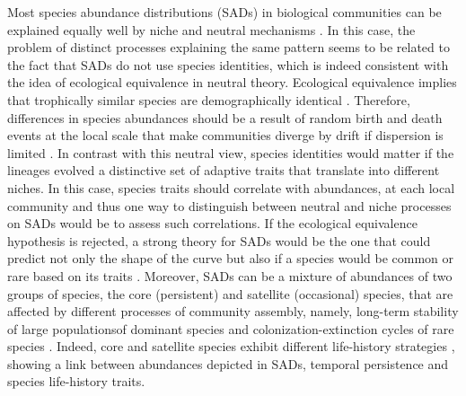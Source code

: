 \documentclass[12pt]{article}
\begin{document}
Most species abundance distributions (SADs) in biological communities can be explained equally well by niche and neutral mechanisms \citep{McGill2007}. 
In this case, the problem of distinct processes explaining the same pattern seems to be related to the fact that SADs do not use species identities, which is indeed consistent with the idea of ecological equivalence in neutral theory. Ecological equivalence implies that trophically similar species are demographically identical \citep{Hubbell2001, Hubbell2005}. Therefore, differences in species abundances should be a result of random birth and death events at the local scale that make communities diverge by drift if dispersion is limited \citep{Hubbell2001, Hubbell2005}. 
In contrast with this neutral view, species identities would matter if the lineages evolved a distinctive set of adaptive traits that translate into different niches. In this case, species traits should correlate with abundances,
at each local community %
and thus one way to distinguish between neutral and niche processes on SADs would be to assess such correlations. 
If the ecological equivalence hypothesis is rejected, a strong theory for SADs would be the one that could predict not only the shape of the curve but also if a species would be common or rare based on its traits \citep{Mcgill2003}. 
Moreover, SADs can be a mixture of abundances of two groups of species, the core (persistent) and satellite (occasional) species, that are affected by different processes of community assembly, namely, long-term stability of large populationsof dominant species and  colonization-extinction cycles of rare species \citep{Magurran2003}. Indeed, core and satellite species exhibit different life-history strategies \cite{Supp2015}, showing a link between abundances depicted in SADs, temporal persistence and species life-history traits. %
\end{document}

